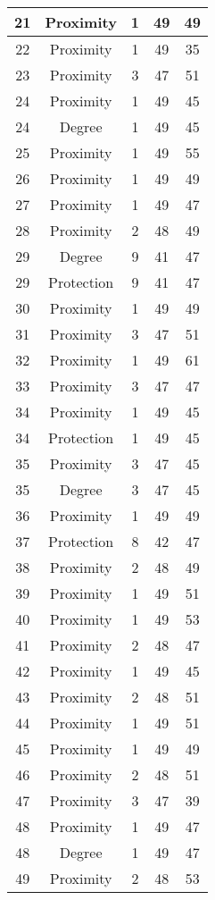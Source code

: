 \documentclass[results.tex]{subfiles}
\begin{document}
\begin{center}
\begin{tabular}{| c || c | c | c | c |}
    \hline
    21 & Proximity & 1 & 49 & 49 \\ 
    \hline
    22 & Proximity & 1 & 49 & 35 \\ 
    \hline
    23 & Proximity & 3 & 47 & 51 \\ 
    \hline
    24 & Proximity & 1 & 49 & 45 \\ 
    \hline
    24 & Degree & 1 & 49 & 45 \\ 
    \hline
    25 & Proximity & 1 & 49 & 55 \\ 
    \hline
    26 & Proximity & 1 & 49 & 49 \\ 
    \hline
    27 & Proximity & 1 & 49 & 47 \\ 
    \hline
    28 & Proximity & 2 & 48 & 49 \\ 
    \hline
    29 & Degree & 9 & 41 & 47 \\ 
    \hline
    29 & Protection & 9 & 41 & 47 \\ 
    \hline
    30 & Proximity & 1 & 49 & 49 \\ 
    \hline
    31 & Proximity & 3 & 47 & 51 \\ 
    \hline
    32 & Proximity & 1 & 49 & 61 \\ 
    \hline
    33 & Proximity & 3 & 47 & 47 \\ 
    \hline
    34 & Proximity & 1 & 49 & 45 \\ 
    \hline
    34 & Protection & 1 & 49 & 45 \\ 
    \hline
    35 & Proximity & 3 & 47 & 45 \\ 
    \hline
    35 & Degree & 3 & 47 & 45 \\ 
    \hline
    36 & Proximity & 1 & 49 & 49 \\ 
    \hline
    37 & Protection & 8 & 42 & 47 \\ 
    \hline
    38 & Proximity & 2 & 48 & 49 \\ 
    \hline
    39 & Proximity & 1 & 49 & 51 \\ 
    \hline
    40 & Proximity & 1 & 49 & 53 \\ 
    \hline
    41 & Proximity & 2 & 48 & 47 \\ 
    \hline
    42 & Proximity & 1 & 49 & 45 \\ 
    \hline
    43 & Proximity & 2 & 48 & 51 \\ 
    \hline
    44 & Proximity & 1 & 49 & 51 \\ 
    \hline
    45 & Proximity & 1 & 49 & 49 \\ 
    \hline
    46 & Proximity & 2 & 48 & 51 \\ 
    \hline
    47 & Proximity & 3 & 47 & 39 \\ 
    \hline
    48 & Proximity & 1 & 49 & 47 \\ 
    \hline
    48 & Degree & 1 & 49 & 47 \\ 
    \hline
    49 & Proximity & 2 & 48 & 53 \\ 
    \hline   \end{tabular}
\end{center}
\end{document}
